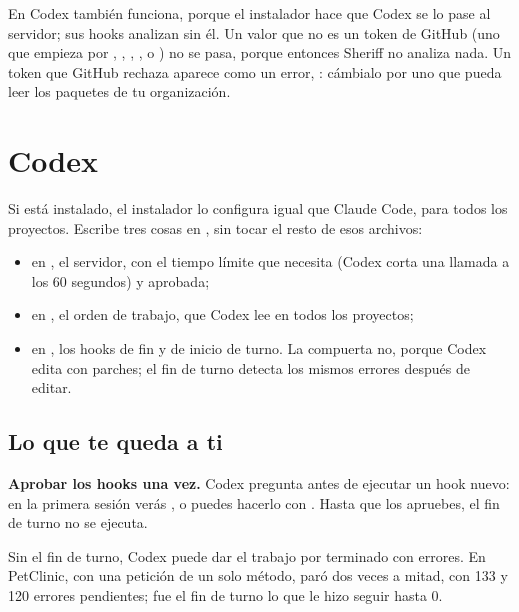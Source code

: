 \documentclass[11pt,a4paper]{article}
\begin{document}
En Codex también funciona, porque el instalador hace que Codex se lo pase al
servidor; sus hooks analizan sin él. Un valor que no es un token de GitHub (uno
que empieza por , , , ,
 o ) no se pasa, porque entonces Sheriff no analiza
nada. Un token que GitHub rechaza aparece como un error,
: cámbialo por uno que
pueda leer los paquetes de tu organización.

\section{Codex}
\label{sec:codex}

Si  está instalado, el instalador lo configura igual que Claude
Code, para todos los proyectos. Escribe tres cosas en , sin
tocar el resto de esos archivos:

\begin{itemize}
  \item en , el servidor, con el tiempo límite que necesita
        (Codex corta una llamada a los 60 segundos) y 
        aprobada;
  \item en , el orden de trabajo, que Codex lee en todos los
        proyectos;
  \item en , los hooks de fin y de inicio de turno. La
        compuerta no, porque Codex edita con parches; el fin de turno detecta
        los mismos errores después de editar.
\end{itemize}

\subsection{Lo que te queda a ti}

\textbf{Aprobar los hooks una vez.} Codex pregunta antes de ejecutar un hook
nuevo: en la primera sesión verás , o puedes hacerlo con
. Hasta que los apruebes, el fin de turno no se ejecuta.

\begin{warning}
Sin el fin de turno, Codex puede dar el trabajo por terminado con errores. En
PetClinic, con una petición de un solo método, paró dos veces a mitad, con 133
y 120 errores pendientes; fue el fin de turno lo que le hizo seguir hasta 0.
\end{warning}
\end{document}
